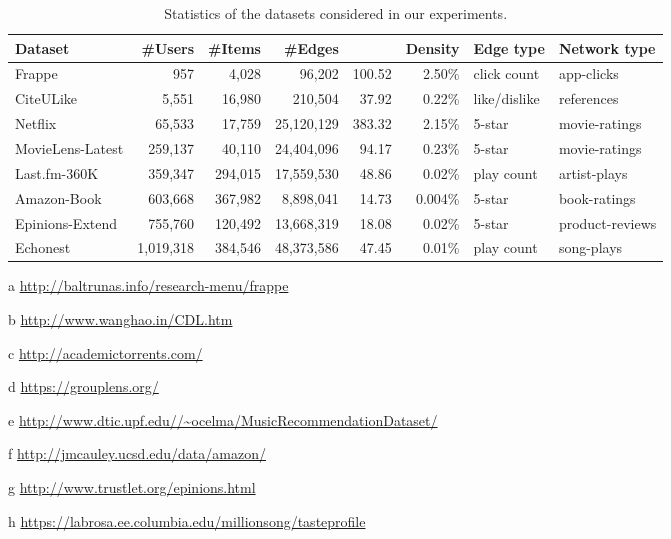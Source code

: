 \documentclass[sigconf,anonymous=false]{acmart}
\begin{document}
{
\begin{table*}\footnotesize
\centering
\begin{threeparttable}[t]
\resizebox{0.9\textwidth}{!}
{
\begin{tabular}{lrrrrrll}
\toprule
    Dataset & \#Users &  \#Items & \#Edges &  & Density & Edge type & Network type \\
\midrule
    Frappe\tnote{a}		    & 957		& 4,028		& 96,202	    & 100.52    & 2.50\%	& click count  & app-clicks		\\
CiteULike\tnote{b}      & 5,551		& 16,980	& 210,504	    & 37.92     & 0.22\%	& like/dislike & references		\\
    Netflix\tnote{c}        & 65,533	& 17,759	& 25,120,129    & 383.32    & 2.15\%	& 5-star       & movie-ratings		\\
    MovieLens-Latest\tnote{d}    & 259,137	& 40,110	& 24,404,096    & 94.17     & 0.23\% 	& 5-star       & movie-ratings 	\\
    Last.fm-360K\tnote{e}        & 359,347	& 294,015	& 17,559,530    & 48.86     & 0.02\%	& play count   & artist-plays		\\
    Amazon-Book\tnote{f}    & 603,668	& 367,982	& 8,898,041	    & 14.73     & 0.004\%	& 5-star       & book-ratings		\\
    Epinions-Extend\tnote{g}& 755,760	& 120,492	& 13,668,319    & 18.08     & 0.02\%	& 5-star       & product-reviews	\\
    Echonest\tnote{h}       & 1,019,318 & 384,546	& 48,373,586    & 47.45     & 0.01\%	& play count   & song-plays		\\
\bottomrule
\end{tabular}
}
\caption{Statistics of the datasets considered in our experiments.}
\label{tb:data}
\begin{tablenotes}
\setlength{\columnsep}{0.8cm}
\setlength{\multicolsep}{0cm}
\begin{multicols}{2}
    \item[a] \url{http://baltrunas.info/research-menu/frappe}
    \item[b] \url{http://www.wanghao.in/CDL.htm}
    \item[c] \url{http://academictorrents.com/}
    \item[d] \url{https://grouplens.org/}
    \item[e] \url{http://www.dtic.upf.edu//~ocelma/MusicRecommendationDataset/}
    \item[f] \url{http://jmcauley.ucsd.edu/data/amazon/}
    \item[g] \url{http://www.trustlet.org/epinions.html}
    \item[h] \url{https://labrosa.ee.columbia.edu/millionsong/tasteprofile}
\end{multicols}
\end{tablenotes}
\end{threeparttable}
\end{table*}}
\end{document}
